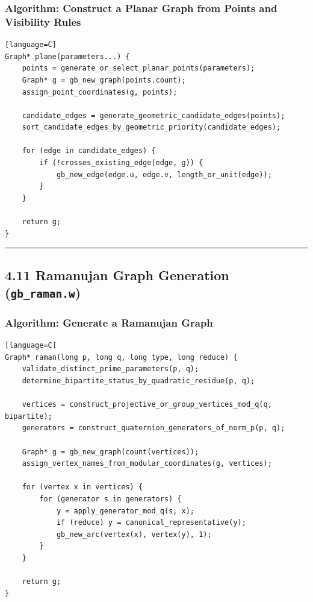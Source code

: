 \documentclass[11pt]{article}
\begin{document}
\subsubsection{Algorithm: Construct a Planar Graph from Points and Visibility Rules}\label{algorithm-construct-a-planar-graph-from-points-and-visibility-rules}

\begin{verbatim}[language=C]
Graph* plane(parameters...) {
    points = generate_or_select_planar_points(parameters);
    Graph* g = gb_new_graph(points.count);
    assign_point_coordinates(g, points);

    candidate_edges = generate_geometric_candidate_edges(points);
    sort_candidate_edges_by_geometric_priority(candidate_edges);

    for (edge in candidate_edges) {
        if (!crosses_existing_edge(edge, g)) {
            gb_new_edge(edge.u, edge.v, length_or_unit(edge));
        }
    }

    return g;
}
\end{verbatim}

\begin{center}\rule{0.5\linewidth}{0.5pt}\end{center}

\subsection{\texorpdfstring{4.11 Ramanujan Graph Generation (\texttt{gb\_raman.w})}{4.11 Ramanujan Graph Generation (gb\_raman.w)}}\label{ramanujan-graph-generation-gb_raman.w}

\subsubsection{Algorithm: Generate a Ramanujan Graph}\label{algorithm-generate-a-ramanujan-graph}

\begin{verbatim}[language=C]
Graph* raman(long p, long q, long type, long reduce) {
    validate_distinct_prime_parameters(p, q);
    determine_bipartite_status_by_quadratic_residue(p, q);

    vertices = construct_projective_or_group_vertices_mod_q(q, bipartite);
    generators = construct_quaternion_generators_of_norm_p(p, q);

    Graph* g = gb_new_graph(count(vertices));
    assign_vertex_names_from_modular_coordinates(g, vertices);

    for (vertex x in vertices) {
        for (generator s in generators) {
            y = apply_generator_mod_q(s, x);
            if (reduce) y = canonical_representative(y);
            gb_new_arc(vertex(x), vertex(y), 1);
        }
    }

    return g;
}
\end{verbatim}
\end{document}
